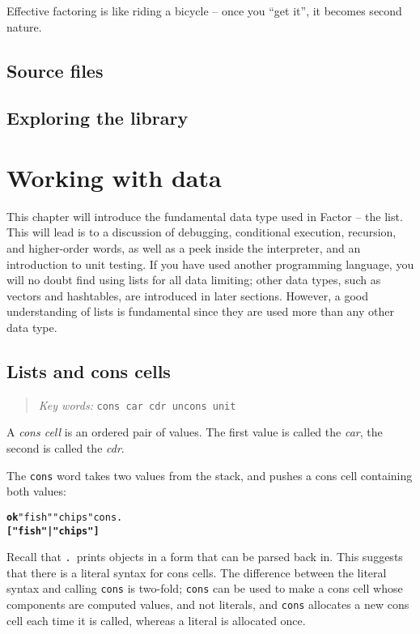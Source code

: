 \documentclass[english]{book}
\newcommand{\chapkeywords}[1]{{\parbox{10cm}{\begin{minipage}[b]{10cm}
\begin{quote}
\emph{Key words:} \texttt{#1}
\end{quote}
\end{minipage}}}}
\begin{document}
Effective factoring is like riding a bicycle -- once you ``get it'', it becomes second nature.

\section{Source files}

\section{Exploring the library}

\chapter{Working with data}

This chapter will introduce the fundamental data type used in Factor -- the list.
This will lead is to a discussion of debugging, conditional execution, recursion, and higher-order words, as well as a peek inside the interpreter, and an introduction to unit testing. If you have used another programming language, you will no doubt find using lists for all data limiting; other data types, such as vectors and hashtables, are introduced in later sections. However, a good understanding of lists is fundamental since they are used more than any other data type. 

\section{Lists and cons cells}

\chapkeywords{cons car cdr uncons unit}

A \emph{cons cell} is an ordered pair of values. The first value is called the \emph{car},
the second is called the \emph{cdr}.

The \texttt{cons} word takes two values from the stack, and pushes a cons cell containing both values:

\begin{alltt}
\textbf{ok} "fish" "chips" cons .
\textbf{{[} "fish" | "chips" {]}}
\end{alltt}

Recall that \texttt{.}~prints objects in a form that can be parsed back in. This suggests that there is a literal syntax for cons cells. The difference between the literal syntax and calling \texttt{cons} is two-fold; \texttt{cons} can be used to make a cons cell whose components are computed values, and not literals, and \texttt{cons} allocates a new cons cell each time it is called, whereas a literal is allocated once.
\end{document}
